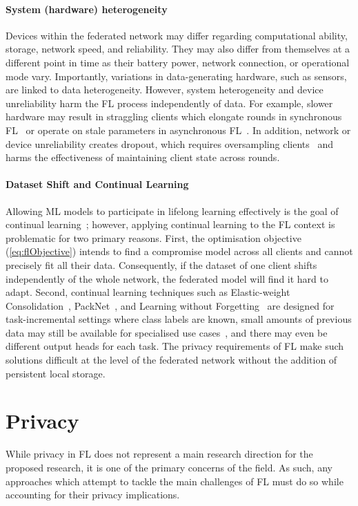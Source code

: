 \paragraph{System (hardware) heterogeneity} Devices within the federated network may differ regarding computational ability, storage, network speed, and reliability. They may also differ from themselves at a different point in time as their battery power, network connection, or operational mode vary. Importantly, variations in data-generating hardware, such as sensors, are linked to data heterogeneity. However, system heterogeneity and device unreliability harm the FL process independently of data. For example, slower hardware may result in straggling clients which elongate rounds in synchronous FL~\citep{ScaleSystemDesign,FedProx} or operate on stale parameters in asynchronous FL~\citep{AsyncFedOpt,PAPAYA}\@. In addition, network or device unreliability creates dropout, which requires oversampling clients~\cite{ScaleSystemDesign} and harms the effectiveness of maintaining client state across rounds.

\paragraph{Dataset Shift and Continual Learning}  Allowing ML models to participate in lifelong learning effectively is the goal of continual learning~\citep{ContinualLearningSurvey}; however, applying continual learning to the FL context is problematic for two primary reasons. First, the optimisation objective (\cref{eq:flObjective}) intends to find a compromise model across all clients and cannot precisely fit all their data. Consequently, if the dataset of one client shifts independently of the whole network, the federated model will find it hard to adapt. Second, continual learning techniques such as Elastic-weight Consolidation~\citep{EWC},  PackNet~\citep{PackNetAM}, and Learning without Forgetting~\citep{LearningWithoutForgetting} are designed for task-incremental settings where class labels are known, small amounts of previous data may still be available for specialised use cases~\citep{EWC}, and there may even be different output heads for each task. The privacy requirements of FL make such solutions difficult at the level of the federated network without the addition of persistent local storage.
\section{Privacy}
While privacy in FL does not represent a main research direction for the proposed research, it is one of the primary concerns of the field. As such, any approaches which attempt to tackle the main challenges of FL must do so while accounting for their privacy implications.

